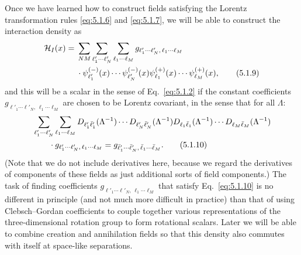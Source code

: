 Once we have learned how to construct fields satisfying the Lorentz
transformation rules \eqref{eq:5.1.6} and \eqref{eq:5.1.7}, we will be able to construct the
interaction density as
\begin{align}
  \mathcal{H}_I(x)={}&\sum_{NM}\sum_{\ell'_1\cdots\ell'_N}
  \sum_{\ell_1\cdots\ell_M}
  g_{\ell'_1\cdots\ell'_N,\,\ell_1\cdots\ell_M}
  \notag\\
  &\cdot\psi^{(-)}_{\ell'_1}(x)\cdots\psi^{(-)}_{\ell'_N}(x)
  \psi^{(+)}_{\ell_1}(x)\cdots\psi^{(+)}_{\ell_M}(x),
  \tag{5.1.9}\label{eq:5.1.9}
\end{align}
and this will be a scalar in the sense of Eq.~\eqref{eq:5.1.2} if the constant
coefficients $g_{\ell'_1\cdots\ell'_N,\,\ell_1\cdots\ell_M}$ are chosen to be
Lorentz covariant, in the sense that for all $\Lambda$:
\begin{align}
  &\sum_{\ell'_1\cdots\ell'_N}\sum_{\ell_1\cdots\ell_M}
  D_{\ell'_1\bar\ell'_1}(\Lambda^{-1})\cdots
  D_{\ell'_N\bar\ell'_N}(\Lambda^{-1})
  D_{\ell_1\bar\ell_1}(\Lambda^{-1})\cdots
  D_{\ell_M\bar\ell_M}(\Lambda^{-1})
  \notag\\
  &\qquad\cdot g_{\ell'_1\cdots\ell'_N,\,\ell_1\cdots\ell_M}
  =g_{\bar\ell'_1\cdots\bar\ell'_N,\,\bar\ell_1\cdots\bar\ell_M}.
  \tag{5.1.10}\label{eq:5.1.10}
\end{align}
(Note that we do not include derivatives here, because we regard the derivatives
of components of these fields as just additional sorts of field components.)
The task of finding coefficients $g_{\ell'_1\cdots\ell'_N,\,\ell_1\cdots\ell_M}$
that satisfy Eq.~\eqref{eq:5.1.10} is no different in principle (and not much more
difficult in practice) than that of using Clebsch--Gordan coefficients to
couple together various representations of the three-dimensional rotation
group to form rotational scalars. Later we will be able to combine creation
and annihilation fields so that this density also commutes with itself at
space-like separations.

